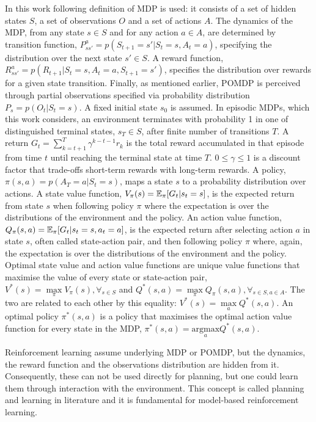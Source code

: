 In this work following definition of MDP is used: it consists of a set of hidden states $S$, a set of observations $O$ and a set of actions $A$. The dynamics of the MDP, from any state $s \in S$ and for any action $a \in A$, are determined by transition function, $P^a_{ss'} = p(S_{t+1} = s' | S_t = s, A_t = a)$, specifying the distribution over the next state $s' \in S$. A reward function, $R^a_{ss'} = p(R_{t+1} | S_t = s, A_t = a, S_{t+1} = s')$, specifies the distribution over rewards for a given state transition. Finally, as mentioned earlier, POMDP is perceived through partial observations specified via probability distribution $P_s = p(O_t | S_t = s)$.
A fixed initial state $s_0$ is assumed. In episodic MDPs, which this work considers, an environment terminates with probability 1 in one of distinguished terminal states, $s_T \in S$, after finite number of transitions $T$. A return $G_t = \sum^T_{k=t+1}\gamma^{k-t-1}r_k$ is the total reward accumulated in that episode from time $t$ until reaching the terminal state at time $T$. $0 \leqslant \gamma \leqslant 1$ is a discount factor that trade-offs short-term rewards with long-term rewards.
A policy, $\pi(s, a) = p(A_T = a | S_t = s)$, maps a state $s$ to a probability distribution over actions.
A state value function, $V_\pi(s) = \operatorname{\mathbb{E}}_\pi[G_t | s_t = s]$, is the expected return from state $s$ when following policy $\pi$ where the expectation is over the distributions of the environment and the policy.
An action value function, $Q_\pi(s, a) = \operatorname{\mathbb{E}}_\pi[G_t | s_t = s, a_t = a]$, is the expected return after selecting action $a$ in state $s$, often called state-action pair, and then following policy $\pi$ where, again, the expectation is over the distributions of the environment and the policy.
Optimal state value and action value functions are unique value functions that maximise the value of every state or state-action pair, $V^*(s) = \underset{\pi}{\max}V_\pi(s), \forall_{s \in S}$ and $Q^*(s, a) = \underset{\pi}{\max}Q_\pi(s, a), \forall_{s \in S, a \in A}$. The two are related to each other by this equality: $V^*(s) = \underset{a}{\max}Q^*(s, a)$.
An optimal policy $\pi^*(s, a)$ is a policy that maximises the optimal action value function for every state in the MDP, $\pi^*(s, a) = \underset{a}{\mathrm{argmax}}Q^*(s, a)$.

Reinforcement learning assume underlying MDP or POMDP, but the dynamics, the reward function and the observations distribution are hidden from it. Consequently, these can not be used directly for planning, but one could learn them through interaction with the environment. This concept is called planning and learning in literature \cite{Book.RLAI} and it is fundamental for model-based reinforcement learning.

